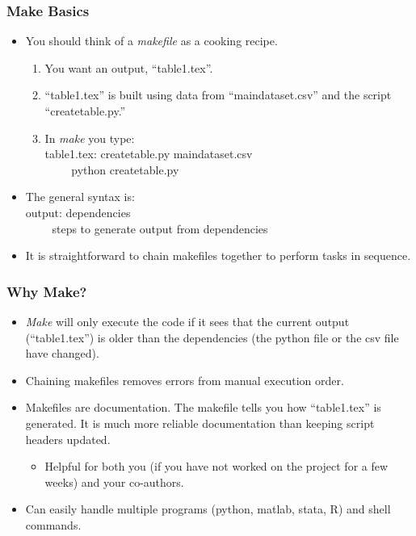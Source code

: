 \documentclass[english,xcolor=svgnames]{beamer}
\begin{document}
\begin{frame}
\frametitle[alignment=center]{Make Basics}
\begin{itemize}
	\item You should think of a \emph{makefile} as a cooking recipe.
	\begin{enumerate}
		\item You want an output, ``table1.tex''.
		\item ``table1.tex'' is built using data from ``maindataset.csv'' and the script ``createtable.py.''
		\item In \emph{make} you type: \\
			table1.tex: createtable.py maindataset.csv \\
			$\qquad$ python createtable.py
	\end{enumerate}
	\item The general syntax is: \\
	output: dependencies \\
	$\qquad$ steps to generate output from dependencies
	\item It is straightforward to chain makefiles together to perform tasks in sequence.
\end{itemize}
\end{frame}

\begin{frame}
\frametitle[alignment=center]{Why Make?}
\begin{itemize}
	\item \emph{Make} will only execute the code if it sees that the current output (``table1.tex'') is older than the dependencies (the python file or the csv file have changed).
	\item Chaining makefiles removes errors from manual execution order.
	\item Makefiles are documentation. The makefile tells you how ``table1.tex'' is generated. It is much more reliable documentation than keeping script headers updated.
	\begin{itemize}
		\item Helpful for both you (if you have not worked on the project for a few weeks) and your co-authors.
	\end{itemize}
	\item Can easily handle multiple programs (python, matlab, stata, R) and shell commands.
\end{itemize}
\end{frame}
\end{document}
